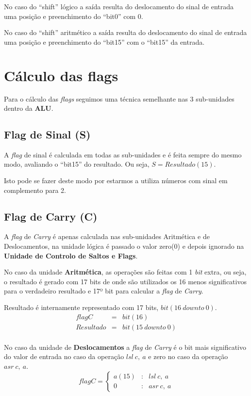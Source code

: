 No caso do ``shift'' lógico a saída resulta do deslocamento do sinal de entrada uma posição e preenchimento do ``bit0'' com 0.\par
No caso do ``shift'' aritmético a saída resulta do deslocamento do sinal de entrada uma posição e preenchimento do ``bit15'' com o ``bit15'' da entrada.

\section{Cálculo das flags}
Para o cálculo das \textit{flags} seguimos uma técnica semelhante nas 3 sub-unidades dentro da \textbf{ALU}.

\subsection{Flag de Sinal (S)}
A \textit{flag} de sinal é calculada em todas as sub-unidades e é feita sempre do mesmo modo, avaliando o ``bit15'' do resultado. Ou seja, \mbox{$S=Resultado(15)$}.\par
Isto pode se fazer deste modo por estarmos a utiliza números com sinal em complemento para 2.

\subsection{Flag de Carry (C)}
A \textit{flag} de \textit{Carry} é apenas calculada nas sub-unidades Aritmética e de Deslocamentos, na unidade lógica é passado o valor zero(0) e depois ignorado na \textbf{Unidade de Controlo de Saltos e Flags}.\par
No caso da unidade \textbf{Aritmética}, as operações são feitas com 1 \textit{bit} extra, ou seja, o resultado é gerado com 17 bits de onde são utilizados os 16 menos significativos para o verdadeiro resultado e 17º bit para calcular a \textit{flag} de \textit{Carry}.\par
Resultado é internamente representado com 17 bits, \mbox{$bit(16\ downto\ 0)$}.
\[\begin{array}{rcl}
flagC & = & bit(16)\\
Resultado & = & bit(15\ downto\ 0)\\
\end{array}
\]\par
No caso da unidade de \textbf{Deslocamentos} a \textit{flag} de \textit{Carry} é o bit mais significativo do valor de entrada no caso da operação \mbox{$lsl\ c,\ a$} e zero no caso da operação \mbox{$asr\ c,\ a$}.
\[ flagC=\left\{
\begin{array}{rcl}
a(15) & : & lsl\ c,\ a\\
0 & : & asr\ c,\ a
\end{array}
\right.\]\par

